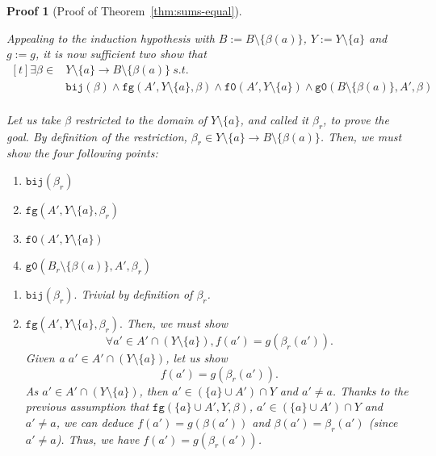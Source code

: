 \documentclass[pdflatex,sn-mathphys]{sn-jnl}%
\theoremstyle{thmstyleone}%
\theoremstyle{thmstyletwo}%
\newtheorem*{pf}{Proof}%
\theoremstyle{thmstylethree}%
\begin{document}
\begin{pf}[Proof of Theorem~\ref{thm:sums-equal}]
\begin{enumerate}
\begin{enumerate}
          Appealing to the induction hypothesis with
          $B:=B\setminus\{\beta(a)\}$, $Y:=Y\setminus\{a\}$ and
          $g:=g$, it is now sufficient two show that
          \begin{equation*}
            \boxed{
              \begin{aligned}[t]
                \exists{}\beta\in{}&Y\setminus\{a\}\rightarrow{}B\setminus\{\beta(a)\}~s.t.~\\
                                   & \mathtt{bij}(\beta)\land\mathtt{fg}(A',Y\setminus\{a\},\beta)\land\mathtt{f0}(A',Y\setminus\{a\})\land\mathtt{g0}(B\setminus\{\beta(a)\},A',\beta) \\
              \end{aligned}
            }
          \end{equation*}

          Let us take $\beta$ restricted to the domain of
          $Y\setminus\{a\}$, and called it $\beta_r$, to prove the
          goal. By definition of the restriction,
          $\beta_r\in{}Y\setminus\{a\}\rightarrow{}B\setminus\{\beta(a)\}$. Then,
          we must show the four following points:
          \begin{enumerate}
          \item $\mathtt{bij}(\beta_r)$
          \item $\mathtt{fg}(A',Y\setminus\{a\},\beta_r)$
          \item $\mathtt{f0}(A',Y\setminus\{a\})$
          \item $\mathtt{g0}(B_r\setminus\{\beta(a)\},A',\beta_r)$
          \end{enumerate}

          \vspace{10pt}
          
          \begin{enumerate}
          \item $\boxed{\mathtt{bij}(\beta_r).}$ Trivial by definition of $\beta_r$.
          \item $\boxed{\mathtt{fg}(A',Y\setminus\{a\},\beta_r).}$
            Then, we must show
            \begin{equation*}
              \boxed{\forall{}a'\in{}A'\cap(Y\setminus\{a\}),f(a')=g(\beta_r(a')).}
            \end{equation*}
            Given a $a'\in{}A'\cap(Y\setminus\{a\})$, let us show
            \begin{equation*}
              \boxed{f(a')=g(\beta_r(a')).}
            \end{equation*}
            As $a'\in{}A'\cap(Y\setminus\{a\})$, then
            $a'\in{}(\{a\}\cup{}A')\cap{}Y$ and $a'\neq{}a$. Thanks to
            the previous assumption that
            $\mathtt{fg}(\{a\}\cup{}A',Y,\beta)$,
            $a'\in{}(\{a\}\cup{}A')\cap{}Y$ and $a'\neq{}a$, we can
            deduce $f(a')=g(\beta(a'))$ and $\beta(a')=\beta_r(a')$
            (since $a'\neq{}a$). Thus, we have $f(a')=g(\beta_r(a'))$.
            

\end{enumerate}
\end{enumerate}
\end{enumerate}
\end{pf}
\end{document}
